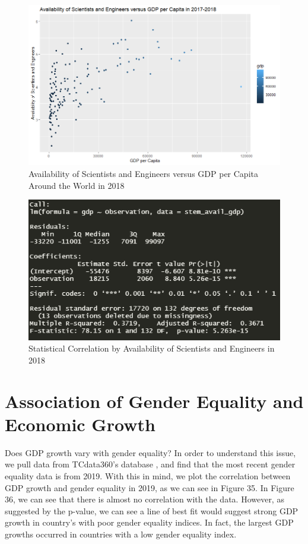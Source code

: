\documentclass[15pt]{article}
\begin{document}
\\
\begin{figure}[H]
    \centering
    \includegraphics[scale = 0.7]{Part6_stem_avail_vs_gdp.png}
    \caption{Availability of Scientists and Engineers versus GDP per Capita Around the World in 2018}
\end{figure}

\begin{figure}[H]
    \centering
    \includegraphics[scale = 0.7]{Part6_r^2.PNG}
    \caption{Statistical Correlation by Availability of Scientists and Engineers in 2018}
\end{figure}

\newpage

\section{Association of Gender Equality and Economic Growth}

Does GDP growth vary with gender equality? In order to understand this issue, we pull data from TCdata360's database \cite{2}, and find that the most recent gender equality data is from 2019. With this in mind, we plot the correlation between GDP growth and gender equality in 2019, as we can see in Figure 35. In Figure 36, we can see that there is almost no correlation with the data. However, as suggested by the p-value, we can see a line of best fit would suggest strong GDP growth in country's with poor gender equality indices. In fact, the largest GDP growths occurred in countries with a low gender equality index.
\end{document}
